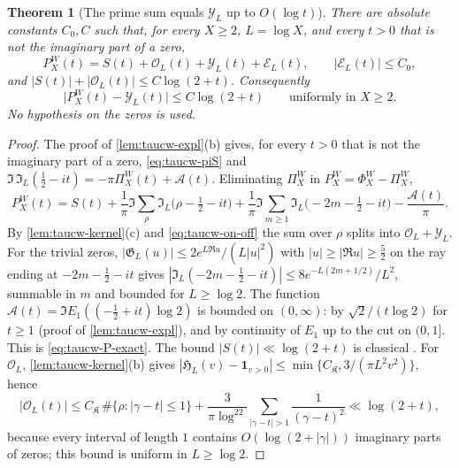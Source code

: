 \documentclass[11pt,a4paper]{article}
\numberwithin{equation}{section}
\newtheorem{theorem}{Theorem}[section]
\theoremstyle{definition}
\theoremstyle{remark}
\begin{document}
\begin{theorem}[The prime sum equals $\mathcal Y_L$ up to $O(\log t)$]\label{thm:taucw-P}
There are absolute constants $C_0,C$ such that, for every $X\ge2$, $L=\log X$, and every $t>0$ that is not the imaginary part of a zero,
\begin{equation}\label{eq:taucw-P-exact}
P^W_X(t)=S(t)+\mathcal O_L(t)+\mathcal Y_L(t)+\mathcal E_L(t),\qquad|\mathcal E_L(t)|\le C_0,
\end{equation}
and $|S(t)|+|\mathcal O_L(t)|\le C\log(2+t)$. Consequently
\begin{equation}\label{eq:taucw-P-Y}
\bigl|P^W_X(t)-\mathcal Y_L(t)\bigr|\le C\log(2+t)\qquad\text{uniformly in }X\ge2 .
\end{equation}
No hypothesis on the zeros is used.
\end{theorem}
\begin{proof}
The proof of \cref{lem:taucw-expl}(b) gives, for every $t>0$ that is not the imaginary part of a zero, \eqref{eq:taucw-piS} and $\Im\,\mathfrak I_L(\frac12-it)=-\pi\Pi^W_X(t)+\mathscr A(t)$. Eliminating $\Pi_X^W$ in $P^W_X=\Phi^W_X-\Pi^W_X$,
\begin{equation}
P^W_X(t)=S(t)+\frac1\pi\Im\sum_\rho\mathfrak I_L\bigl(\rho-\tfrac12-it\bigr)+\frac1\pi\Im\sum_{m\ge1}\mathfrak I_L\bigl(-2m-\tfrac12-it\bigr)-\frac{\mathscr A(t)}\pi .
\end{equation}
By \cref{lem:taucw-kernel}(c) and \eqref{eq:taucw-on-off} the sum over $\rho$ splits into $\mathcal O_L+\mathcal Y_L$. For the trivial zeros, $|\mathfrak G_L(u)|\le2e^{L\Re u}/(L|u|^2)$ with $|u|\ge|\Re u|\ge\frac52$ on the ray ending at $-2m-\frac12-it$ gives $|\mathfrak I_L(-2m-\frac12-it)|\le8e^{-L(2m+1/2)}/L^2$, summable in $m$ and bounded for $L\ge\log2$. The function $\mathscr A(t)=\Im E_1((-\frac12+it)\log2)$ is bounded on $(0,\infty)$: by $\sqrt2/(t\log2)$ for $t\ge1$ (proof of \cref{lem:taucw-expl}), and by continuity of $E_1$ up to the cut on $(0,1]$. This is \eqref{eq:taucw-P-exact}. The bound $|S(t)|\ll\log(2+t)$ is classical \cite{Titchmarsh}. For $\mathcal O_L$, \cref{lem:taucw-kernel}(b) gives $|\mathfrak H_L(v)-\mathbf 1_{v>0}|\le\min\{C_{\mathfrak K},3/(\pi L^2v^2)\}$, hence
\begin{equation}
|\mathcal O_L(t)|\le C_{\mathfrak K}\,\#\{\rho:|\gamma-t|\le1\}+\frac3{\pi\log^22}\sum_{|\gamma-t|>1}\frac1{(\gamma-t)^2}\ll\log(2+t),
\end{equation}
because every interval of length $1$ contains $O(\log(2+|\gamma|))$ imaginary parts of zeros; this bound is uniform in $L\ge\log2$.
\end{proof}
\end{document}
